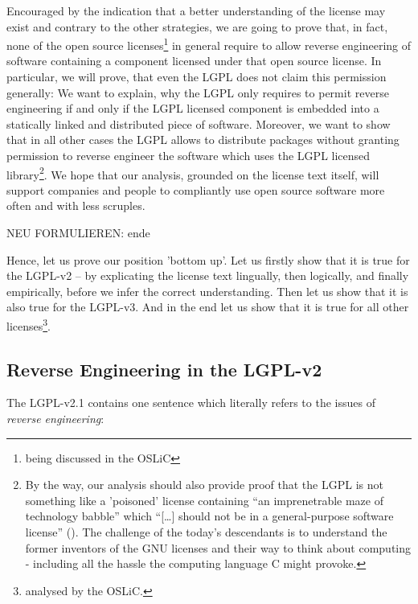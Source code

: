 Encouraged by the indication that a better understanding of the license may
exist and contrary to the other strategies, we are going to prove that, in
fact, none of the open source licenses\footnote{being discussed in the OSLiC} in
general require to allow reverse engineering of software containing a component
licensed under that open source license. In particular, we will prove, that even
the LGPL does not claim this permission generally: We want to explain, why the
LGPL only requires to permit reverse engineering if and only if the LGPL
licensed component is embedded into a statically linked and distributed piece of
software. Moreover, we want to show that in all other cases the LGPL allows 
to distribute packages without granting permission to reverse engineer the
software which uses the LGPL licensed library\footnote{By the way, our analysis
should also provide proof that the LGPL is not something like a 'poisoned'
license containing \enquote{an imprenetrable maze of technology babble} which
\enquote{[\ldots] should not be in a general-purpose software license}
(\cite[cf.][124]{Rosen2005a}). The challenge of the today's descendants is to
understand the former inventors of the GNU licenses and their way to think about
computing - including all the hassle the computing language C might provoke.}.
We hope that our analysis, grounded on the license text itself, will support
companies and people to compliantly use open source software more often and with
less scruples.

NEU FORMULIEREN: ende

Hence, let us prove our position 'bottom up'. Let us firstly show that it is
true for the LGPL-v2 -- by explicating the license text lingually, then
logically, and finally empirically, before we infer the correct understanding.
Then let us show that it is also true for the LGPL-v3. And in the end let us
show that it is true for all other licenses\footnote{analysed by the OSLiC.}.

\subsection{Reverse Engineering in the LGPL-v2}
The LGPL-v2.1 contains one sentence which literally refers to the issues of
\emph{reverse engineering}:

